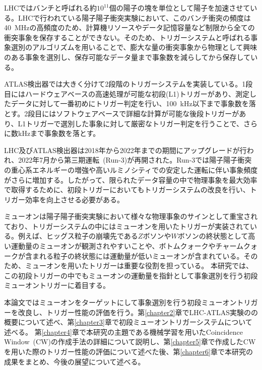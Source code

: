LHCではバンチと呼ばれる約$10^{11}$個の陽子の塊を単位として陽子を加速させている。LHCで行われている陽子陽子衝突実験において、このバンチ衝突の頻度は40~MHzの高頻度のため、計算機リソースやデータ記憶容量など制限から全ての衝突事象を保存することができない。そのため、トリガーシステムと呼ばれる事象選別のアルゴリズムを用いることで、膨大な量の衝突事象から物理として興味のある事象を選別し、保存可能なデータ量まで事象数を減らしてから保存している。

ATLAS検出器では大きく分けて2段階のトリガーシステムを実装している。1段目にはハードウェアベースの高速処理が可能な初段(L1)トリガーがあり、測定したデータに対して一番初めにトリガー判定を行い、100~kHz以下まで事象数を落とす。2段目にはソフトウェアベースで詳細な計算が可能な後段トリガーがあり、L1トリガーで選別した事象に対して厳密なトリガー判定を行うことで、さらに数kHzまで事象数を落とす。

LHC及びATLAS検出器は2018年から2022年までの期間にアップグレードが行われ、2022年7月から第三期運転~(Run-3)が再開された。Run-3では陽子陽子衝突の重心系エネルギーの増強や高いルミノシティでの安定した運転に伴い事象頻度がさらに増加する。したがって、限られたデータ容量の中で物理事象を最大効率で取得するために、初段トリガーにおいてもトリガーシステムの改良を行い、トリガー効率を向上させる必要がある\cite{article:phase-1}。

ミューオンは陽子陽子衝突実験において様々な物理事象のサインとして重宝されており、トリガーシステムの中にはミューオンを用いたトリガーが実装されている。例えば、ヒッグス粒子の崩壊先である$Z$ボソンや$W$ボソンの終状態として高い運動量のミューオンが観測されやすいことや、ボトムクォークやチャームクォークが含まれる粒子の終状態には運動量が低いミューオンが含まれている。そのため、ミューオンを用いたトリガーは重要な役割を担っている。
本研究では、この初段トリガーの中でもミューオンの運動量を指針として事象選別を行う初段ミューオントリガーに着目する。

本論文ではミューオンをターゲットにして事象選別を行う初段ミューオントリガーを改良し、トリガー性能の評価を行う。第\ref{chapter2}章でLHC-ATLAS実験のの概要について述べ、第\ref{chapter3}章で初段ミューオントリガーシステムについて述べる。
第\ref{chapter4}章で本研究の主題である機械学習を用いたCoincidence Window~(CW)の作成手法の詳細について説明し、第\ref{chapter5}章で作成したCWを用いた際のトリガー性能の評価について述べた後、第\ref{chapter6}章で本研究の成果をまとめ、今後の展望について述べる。



